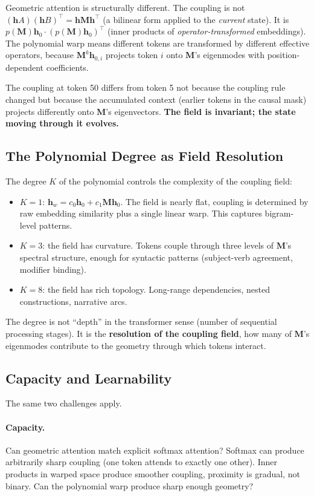 \documentclass[11pt, a4paper]{article}
\newcommand{\M}{\mathbf{M}}
\newcommand{\h}{\mathbf{h}}
\theoremstyle{plain}
\theoremstyle{definition}
\theoremstyle{remark}
\begin{document}
Geometric attention is structurally different.
The coupling is not $(\h A)(\h B)^\top = \h \M \h^\top$ (a bilinear form applied to the \emph{current} state).
It is $p(\M)\h_0 \cdot (p(\M)\h_0)^\top$ (inner products of \emph{operator-transformed} embeddings).
The polynomial warp means different tokens are transformed by different effective operators, because $\M^k \h_{0,i}$ projects token $i$ onto $\M$'s eigenmodes with position-dependent coefficients.

The coupling at token 50 differs from token 5 not because the coupling rule changed but because the accumulated context (earlier tokens in the causal mask) projects differently onto $\M$'s eigenvectors.
\textbf{The field is invariant; the state moving through it evolves.}

\subsection{The Polynomial Degree as Field Resolution}

The degree $K$ of the polynomial controls the complexity of the coupling field:
\begin{itemize}[nosep]
\item $K = 1$: $\h_w = c_0 \h_0 + c_1 \M \h_0$. The field is nearly flat, coupling is determined by raw embedding similarity plus a single linear warp. This captures bigram-level patterns.
\item $K = 3$: the field has curvature. Tokens couple through three levels of $\M$'s spectral structure, enough for syntactic patterns (subject-verb agreement, modifier binding).
\item $K = 8$: the field has rich topology. Long-range dependencies, nested constructions, narrative arcs.
\end{itemize}

The degree is not ``depth'' in the transformer sense (number of sequential processing stages).
It is the \textbf{resolution of the coupling field}, how many of $\M$'s eigenmodes contribute to the geometry through which tokens interact.

\subsection{Capacity and Learnability}

The same two challenges apply.

\paragraph{Capacity.}
Can geometric attention match explicit softmax attention?
Softmax can produce arbitrarily sharp coupling (one token attends to exactly one other).
Inner products in warped space produce smoother coupling, proximity is gradual, not binary.
Can the polynomial warp produce sharp enough geometry?
\end{document}
